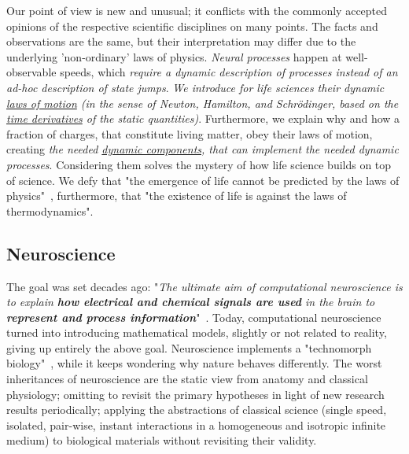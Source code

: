 Our point of view is new and unusual; it conflicts with the commonly accepted opinions of the respective scientific disciplines on many points.
The facts and observations are the same, but their interpretation may differ due to the underlying 'non-ordinary' laws of physics.
\textit{Neural processes} happen at well-observable speeds, which \textit{require a dynamic description of processes instead of an ad-hoc description of state jumps}.
\textit{We introduce for life sciences their dynamic \hyperlink{PhysicsLawsOfMotion}{laws of motion} (in the sense of Newton, Hamilton, and Schrödinger, based on the
\hyperlink{NernstPlanckTimeDerivatives}
{time derivatives} of the static quantities)}. Furthermore, 
we explain why and how a fraction of charges, that constitute
living matter, obey their laws of motion,
creating \textit{the needed 
\hyperlink{DynamicLayer}
{dynamic components}, that can implement
the needed dynamic processes}.
Considering them solves the mystery of 
{how life science builds on top of science}.
We defy that
"the emergence of life cannot be predicted by the laws of physics"~\cite{ConservationOfInformation:2021}, furthermore, that "the existence of life is against the laws of thermodynamics".

\subsection*{Neuroscience\label{sec:StateNeuroscience}}
The goal was set decades ago:
"\textit{The ultimate aim of computational neuroscience is
to explain \textbf{how electrical and chemical signals are used} in the brain
to \textbf{represent and process information}}"~\cite{SejnowskiComputationalNeuroscience:1988}.
Today, computational neuroscience turned into introducing mathematical models, slightly or not related to reality, giving up entirely the above goal. 
Neuroscience implements a "technomorph biology"~\cite{VeghTechnomorphBiology:2025}, 
while it keeps wondering why nature behaves differently.
The worst inheritances of neuroscience are the static view from anatomy and classical physiology;
omitting to revisit the primary hypotheses in light of new research results periodically;
applying the abstractions of classical science
(single speed, isolated, pair-wise, instant interactions in a homogeneous and isotropic infinite medium)
to biological materials without revisiting their validity.

